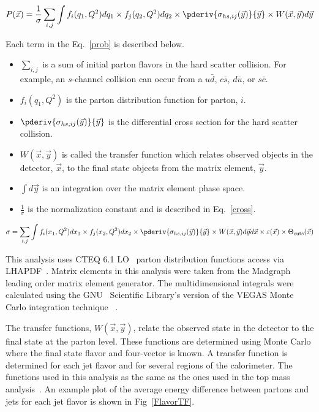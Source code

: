 \begin{equation}
\label{prob}
P(\vec{x}) = \frac{1}{\sigma} \sum_{i,j} \int f_{i}(q_{1}, Q^{2})dq_{1}
\times 
f_{j}(q_{2}, Q^{2})dq_{2} \times \pderiv{\sigma_{hs,ij}(\vec{y})}{\vec{y}}
\times W(\vec{x},\vec{y})d\vec{y}
\end{equation}

\noindent Each term in the Eq.~\ref{prob} is described below.

\begin{itemize}
\item $\sum_{i,j}$ is a sum of initial parton flavors in the hard scatter
collision. For example, an $s$-channel collision can occur from a $u\bar{d}$,
$c\bar{s}$, $d\bar{u}$, or $s\bar{c}$.
\item $f_{i}(q_{1}, Q^{2})$ is the parton distribution function for parton, $i$.
\item $\pderiv{\sigma_{hs,ij}(\vec{y})}{\vec{y}}$ is the differential cross
section for the hard scatter collision.
\item $W(\vec{x},\vec{y})$ is called the transfer function which relates observed
objects in the detector, $\vec{x}$, to the final state objects from the matrix
element, $\vec{y}$.
\item $\int d\vec{y}$ is an integration over the matrix element phase space.
\item $\frac{1}{\sigma}$ is the normalization constant and is described in
Eq.~\ref{cross}.
\end{itemize}

\begin{equation}
\label{cross}
\sigma = \sum_{i,j} \int f_{i}(x_{1}, Q^{2})dx_{1}
\times 
f_{j}(x_{2}, Q^{2})dx_{2} \times \pderiv{\sigma_{hs,ij}(\vec{y})}{\vec{y}}
\times W(\vec{x},\vec{y})d\vec{y}d\vec{x} \times \varepsilon(\vec{x}) \times
\Theta_{\rm{cuts}}(\vec{x})
\end{equation}

\noindent This analysis uses CTEQ 6.1 LO~\cite{Pumplin:2005rh} parton distribution
functions access via LHAPDF~\cite{LHAPDF}. Matrix elements in
this analysis were taken from the Madgraph~\cite{Maltoni:2002qb} leading
order matrix element generator. The multidimensional integrals were calculated
using the GNU~\cite{GNU} Scientific Library's version of the VEGAS Monte Carlo integration technique ~\cite{Lepage:1980dq}.

The transfer functions, $W(\vec{x},\vec{y})$, relate the
observed state in the detector to the final state at the parton level. These
functions are determined using Monte Carlo where the final state flavor and
four-vector is known. A transfer function is determined for each jet flavor and
for several regions of the calorimeter. The functions used in this analysis as the same
as the ones used in the top mass analysis~\cite{JetTF}. An example plot of the
average energy difference between partons and jets for each jet flavor is shown
in Fig~\ref{FlavorTF}.

